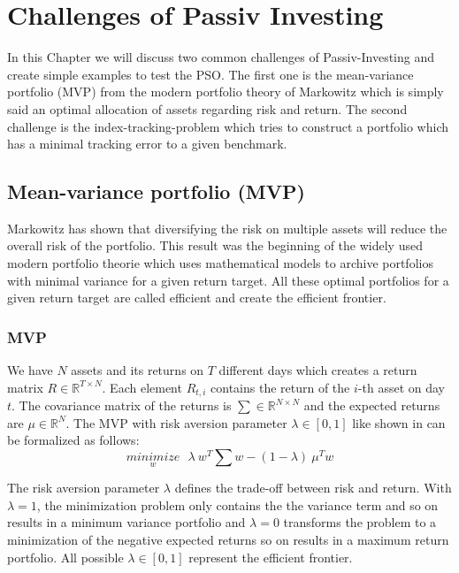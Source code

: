 \documentclass[
  oneside]{book}
\begin{document}
\hypertarget{challenges-of-passiv-investing}{%
\chapter{Challenges of Passiv Investing}\label{challenges-of-passiv-investing}}

In this Chapter we will discuss two common challenges of Passiv-Investing and create simple examples to test the PSO. The first one is the mean-variance portfolio (MVP) from the modern portfolio theory of Markowitz which is simply said an optimal allocation of assets regarding risk and return. The second challenge is the index-tracking-problem which tries to construct a portfolio which has a minimal tracking error to a given benchmark.

\hypertarget{mean-variance-portfolio-mvp}{%
\section{Mean-variance portfolio (MVP)}\label{mean-variance-portfolio-mvp}}

Markowitz has shown that diversifying the risk on multiple assets will reduce the overall risk of the portfolio. This result was the beginning of the widely used modern portfolio theorie which uses mathematical models to archive portfolios with minimal variance for a given return target. All these optimal portfolios for a given return target are called efficient and create the efficient frontier.

\hypertarget{mvp}{%
\subsection{MVP}\label{mvp}}

We have \(N\) assets and its returns on \(T\) different days which creates a return matrix \(R \in \mathbb{R}^{T \times N}\). Each element \(R_{t,i}\) contains the return of the \(i\)-th asset on day \(t\). The covariance matrix of the returns is \(\textstyle\sum \in \mathbb{R}^{N \times N}\) and the expected returns are \(\mu \in \mathbb{R}^{N}\). The MVP with risk aversion parameter \(\lambda \in [0,1]\) like shown in \citep{Mari2005} can be formalized as follows:
\begin{equation} 
\underset{w}{minimize} \ \ \ \lambda \ w^T \textstyle\sum w - (1-\lambda) \ \mu^T w
\label{eq:MVP}
\end{equation}

The risk aversion parameter \(\lambda\) defines the trade-off between risk and return. With \(\lambda = 1\), the minimization problem only contains the the variance term and so on results in a minimum variance portfolio and \(\lambda = 0\) transforms the problem to a minimization of the negative expected returns so on results in a maximum return portfolio. All possible \(\lambda \in [0, 1]\) represent the efficient frontier.
\end{document}

